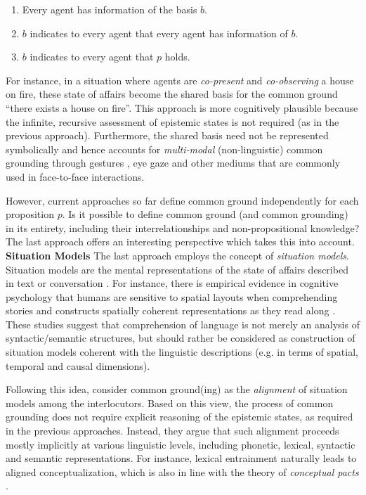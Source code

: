 \begin{enumerate}
  \item Every agent has information of the basis $b$.
  \item $b$ indicates to every agent that every agent has information of $b$.
  \item $b$ indicates to every agent that $p$ holds.
\end{enumerate}

For instance, in a situation where agents are \textit{co-present} and \textit{co-observing} a house on fire, these state of affairs become the shared basis for the common ground ``there exists a house on fire''. This approach is more cognitively plausible because the infinite, recursive assessment of epistemic states is not required (as in the previous approach). Furthermore, the shared basis need not be represented symbolically and hence accounts for \textit{multi-modal} (non-linguistic) common grounding through gestures \citep{lascarides2009formal}, eye gaze \citep{nakano-etal-2003-towards} and other mediums that are commonly used in face-to-face interactions.

However, current approaches so far define common ground independently for each proposition $p$. Is it possible to define common ground (and common grounding) in its entirety, including their interrelationships and non-propositional knowledge? The last approach offers an interesting perspective which takes this into account.
\\

\noindent
\textbf{Situation Models}\quad
The last approach employs the concept of \textit{situation models}. Situation models are the mental representations of the state of affairs described in text or conversation \citep{zwaan1998situation}. For instance, there is empirical evidence in cognitive psychology that humans are sensitive to spatial layouts when comprehending stories \citep{GLENBERG198769} and constructs spatially coherent representations as they read along \citep{ferguson1994properties}. These studies suggest that comprehension of language is not merely an analysis of syntactic/semantic structures, but should rather be considered as construction of situation models coherent with the linguistic descriptions (e.g. in terms of spatial, temporal and causal dimensions).

Following this idea, \citet{pickering2004toward} consider common ground(ing) as the \textit{alignment} of situation models among the interlocutors. Based on this view, the process of common grounding does not require explicit reasoning of the epistemic states, as required in the previous approaches. Instead, they argue that such alignment proceeds mostly implicitly at various linguistic levels, including phonetic, lexical, syntactic and semantic representations. For instance, lexical entrainment naturally leads to aligned conceptualization, which is also in line with the theory of \textit{conceptual pacts} \citep{Brennan1996ConceptualPA}.


